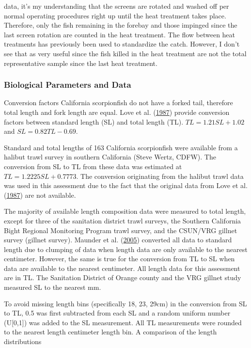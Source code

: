 \documentclass[12pt,]{article}
\begin{document}
data, it's my understanding that the screens are rotated and washed off
per normal operating procedures right up until the heat treatment takes
place. Therefore, only the fish remaining in the forebay and those
impinged since the last screen rotation are counted in the heat
treatment. The flow between heat treatments has previously been used to
standardize the catch. However, I don't see that as very useful since
the fish killed in the heat treatment are not the total representative
sample since the last heat treatment.

\subsubsection{Biological Parameters and
Data}\label{biological-parameters-and-data}

Conversion factors California scorpionfish do not have a forked tail,
therefore total length and fork length are equal. Love et al.
(\protect\hyperlink{ref-Love1987}{1987}) provide conversion factors
between standard length (SL) and total length (TL).
\(TL = 1.21SL + 1.02\) and \(SL = 0.82TL - 0.69\).

Standard and total lengths of 163 California scorpionfish were available
from a halibut trawl survey in southern California (Steve Wertz, CDFW).
The conversion from SL to TL from these data was estimated at
\(TL = 1.2225SL + 0.7773\). The conversion originating from the halibut
trawl data was used in this assessment due to the fact that the original
data from Love et al. (\protect\hyperlink{ref-Love1987}{1987}) are not
available.

The majority of available length composition data were measured to total
length, except for three of the sanitation district trawl surveys, the
Southern California Bight Regional Monitoring Program trawl survey, and
the CSUN/VRG gillnet survey (gillnet survey). Maunder et al.
(\protect\hyperlink{ref-Maunder2005}{2005}) converted all data to
standard length due to clumping of data when length data are only
available to the nearest centimeter. However, the same is true for the
conversion from TL to SL when data are available to the nearest
centimeter. All length data for this assessment are in TL. The
Sanitation District of Orange county and the VRG gillnet study measured
SL to the nearest mm.

To avoid missing length bins (specifically 18, 23, 29cm) in the
conversion from SL to TL, 0.5 was first subtracted from each SL and a
random uniform number (U{[}0,1{]}) was added to the SL measurement. All
TL measurements were rounded to the nearest length centimeter length
bin. A comparison of the length distributions
\end{document}

